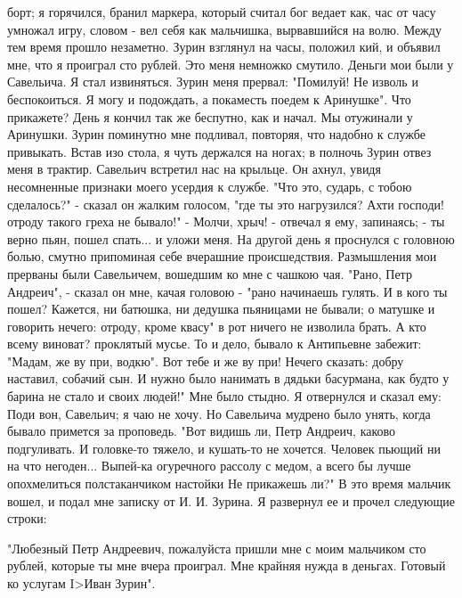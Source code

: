 борт;  я горячился, бранил маркера,  который  считал бог  ведает как, час от
часу  умножал игру, словом - вел себя  как  мальчишка,  вырвавшийся на волю.
Между тем время  прошло  незаметно. Зурин  взглянул на часы, положил кий,  и
объявил  мне, что я  проиграл сто рублей. Это меня немножко смутило.  Деньги
мои были у Савельича. Я стал извиняться. Зурин  меня прервал:  "Помилуй!  Не
изволь и беспокоиться. Я могу и подождать, а покаместь поедем к Аринушке".
Что прикажете? День я кончил так же беспутно, как и начал. Мы отужинали
у Аринушки. Зурин поминутно  мне  подливал,  повторяя, что надобно к  службе
привыкать. Встав изо стола, я чуть держался на ногах; в полночь  Зурин отвез
меня  в  трактир.  Савельич  встретил   нас  на  крыльце.  Он  ахнул,  увидя
несомненные  признаки  моего усердия  к службе. "Что  это, сударь,  с  тобою
сделалось?" -  сказал  он жалким  голосом,  "где  ты  это  нагрузился?  Ахти
господи! отроду  такого греха  не бывало!"  - Молчи, хрыч!  - отвечал я ему,
запинаясь; - ты верно пьян, пошел спать... и уложи меня.
На другой день  я проснулся  с  головною болью,  смутно припоминая себе
вчерашние происшедствия.  Размышления мои прерваны были Савельичем, вошедшим
ко мне с чашкою чая. "Рано, Петр Андреич", - сказал он мне, качая  головою -
"рано начинаешь гулять.  И  в кого ты пошел? Кажется, ни батюшка, ни дедушка
пьяницами не бывали; о матушке и говорить нечего: отроду, кроме квасу" в рот
ничего не изволила брать.  А кто всему  виноват? проклятый мусье. То и дело,
бывало к Антипьевне  забежит:  "Мадам, же ву при, водкю". Вот тебе и  же  ву
при! Нечего  сказать: добру наставил,  собачий сын. И нужно было нанимать  в
дядьки басурмана, как будто у барина не стало и своих людей!"
Мне  было стыдно. Я  отвернулся и сказал ему: Поди вон, Савельич; я чаю
не  хочу.  Но  Савельича  мудрено  было  унять,  когда  бывало  примется  за
проповедь. "Вот видишь ли, Петр  Андреич, каково  подгуливать.  И головке-то
тяжело, и кушать-то не хочется. Человек пьющий ни на что негоден... Выпей-ка
огуречного  рассолу  с медом, а всего  бы лучше опохмелиться  полстаканчиком
настойки Не прикажешь ли?"
В это  время  мальчик вошел,  и подал мне  записку от  И. И. Зурина.  Я
развернул ее и прочел следующие строки:

"Любезный Петр Андреевич,  пожалуйста  пришли мне  с моим мальчиком сто
рублей, которые ты мне вчера проиграл. Мне крайняя нужда в деньгах.
Готовый ко услугам
I>Иван Зурин".

